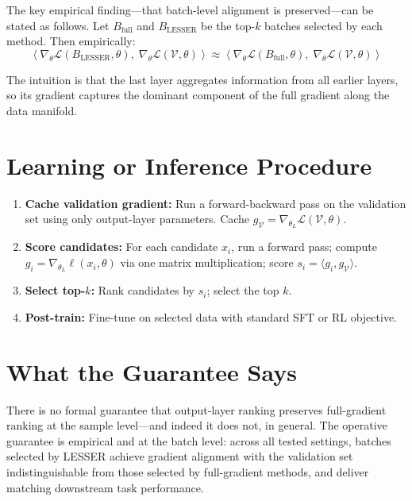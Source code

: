 \documentclass[10pt,twocolumn]{article}
\begin{document}
The key empirical finding---that batch-level alignment is preserved---can be
stated as follows. Let $B_\text{full}$ and $B_\text{LESSER}$ be the top-$k$
batches selected by each method. Then empirically:
\[
\left\langle \nabla_\theta \mathcal{L}(B_\text{LESSER}, \theta),\;
\nabla_\theta \mathcal{L}(\mathcal{V}, \theta) \right\rangle
\approx
\left\langle \nabla_\theta \mathcal{L}(B_\text{full}, \theta),\;
\nabla_\theta \mathcal{L}(\mathcal{V}, \theta) \right\rangle
\]

The intuition is that the last layer aggregates information from all earlier
layers, so its gradient captures the dominant component of the full gradient
along the data manifold.

\section{Learning or Inference Procedure}

\begin{enumerate}[itemsep=2pt,parsep=0pt]
  \item \textbf{Cache validation gradient:} Run a forward-backward pass on the
    validation set using only output-layer parameters. Cache
    $g_\mathcal{V} = \nabla_{\theta_L} \mathcal{L}(\mathcal{V}, \theta)$.
  \item \textbf{Score candidates:} For each candidate $x_i$, run a forward
    pass; compute $g_i = \nabla_{\theta_L} \ell(x_i, \theta)$ via one matrix
    multiplication; score $s_i = \langle g_i, g_\mathcal{V} \rangle$.
  \item \textbf{Select top-$k$:} Rank candidates by $s_i$; select the top $k$.
  \item \textbf{Post-train:} Fine-tune on selected data with standard SFT or
    RL objective.
\end{enumerate}

\section{What the Guarantee Says}

There is no formal guarantee that output-layer ranking preserves full-gradient
ranking at the sample level---and indeed it does not, in general. The operative
guarantee is empirical and at the batch level: across all tested settings,
batches selected by LESSER achieve gradient alignment with the validation set
indistinguishable from those selected by full-gradient methods, and deliver
matching downstream task performance.
\end{document}
